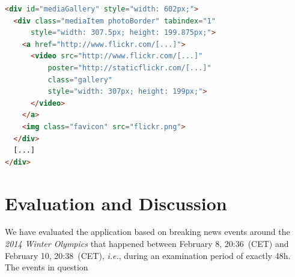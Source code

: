 \documentclass{sig-alternate}
\begin{document}
\begin{lstlisting}[caption={Simplified \emph{Strict Order, Equal Size}
  HTML code}, label=code:mediagalleryhtml, language=HTML]
<div id="mediaGallery" style="width: 602px;">
  <div class="mediaItem photoBorder" tabindex="1"
      style="width: 307.5px; height: 199.875px;">
    <a href="http://www.flickr.com/[...]">
      <video src="http://www.flickr.com/[...]"
          poster="http://staticflickr.com/[...]"
          class="gallery"
          style="width: 307px; height: 199px;">
      </video>
    </a>
    <img class="favicon" src="flickr.png">
  </div>
  [...]
</div>
\end{lstlisting}

\section{Evaluation and Discussion}
\label{sec:evaluation-and-discussion}
\selectfont

We have evaluated the application based on breaking news events
around the \emph{2014 Winter Olympics} that happened between
February 8, 20:36~(CET) and February 10, 20:38~(CET),
\emph{i.e.}, during an examination period of exactly 48h.
The events in question 
\end{document}
